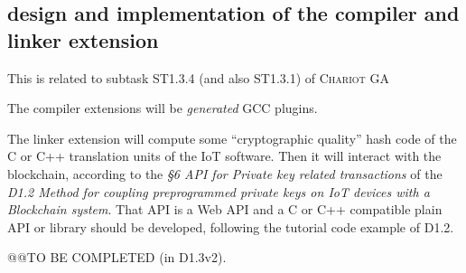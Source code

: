 \subsection{design and implementation of the compiler and linker extension}

\label{subsec:compilinkext}
This is related to subtask ST1.3.4 (and also ST1.3.1) of \textsc{Chariot} GA 

The compiler extensions will be \emph{generated} GCC plugins.

The linker extension will compute some ``cryptographic quality'' hash
code of the C or C++ translation units of the IoT software. Then it
will interact with the blockchain, according to the \emph{§6 API for
  Private key related transactions} of the \emph{D1.2 Method for
  coupling preprogrammed private keys on IoT devices with a Blockchain
  system}. That API is a Web API and a C or C++ compatible plain API
or library should be developed, following the tutorial code example of
D1.2.

@@TO BE COMPLETED (in D1.3v2).
